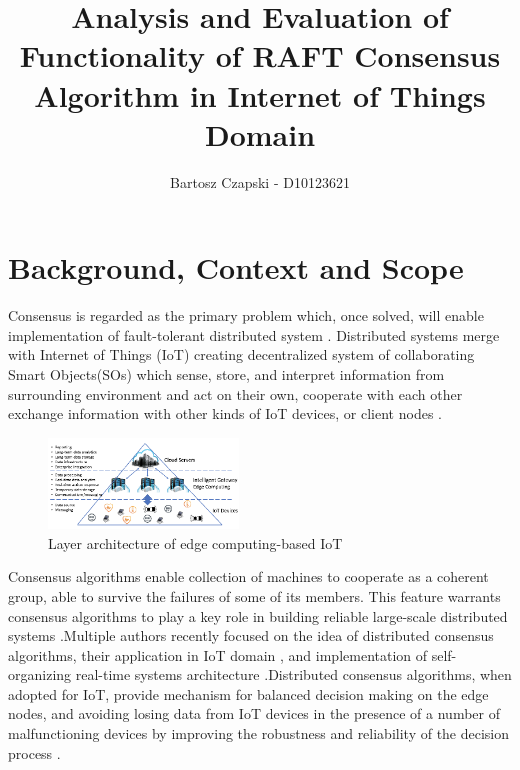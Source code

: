 \documentclass[	DIV=calc,%
							paper=a4,%
							fontsize=11pt,%
							twocolumn]{scrartcl}	 				%
\title{Analysis and Evaluation of Functionality of RAFT Consensus Algorithm in Internet of Things Domain }					%
\author{Bartosz Czapski - D10123621 }
\date{}																				%
\begin{document}
\maketitle
\thispagestyle{fancy} 			%

\section{Background, Context and Scope}
Consensus is regarded as the primary problem which, once solved, will enable implementation of fault-tolerant distributed system \cite{Lamport2005GeneralizedCA}. Distributed systems merge with Internet of Things (IoT) creating decentralized system of collaborating Smart Objects(SOs) which sense, store, and interpret information from surrounding environment and act on their own, cooperate with each other exchange information with other kinds of IoT devices, or client nodes \cite{7488250}.\begin{figure}[H]
\centering
\includegraphics[width=0.45\textwidth]{images/edge.png}
\caption{Layer architecture of edge computing-based IoT}
\end{figure}
\noindent Consensus algorithms enable collection of machines to cooperate as a coherent group, able to  survive the failures of some of its members. This feature warrants consensus algorithms to  play a key role in building reliable large-scale distributed systems \cite{10.5555/2643634.2643666}.\smallskip \newline Multiple authors recently focused on the idea of distributed consensus algorithms, their application in IoT domain \cite{BOF2017601,RAGHAV2020101291,whittaker2020matchmaker,ZHANG2020574,FORTINO202034}, and implementation of self-organizing real-time systems architecture \cite{10.1007/978-3-030-30278-8_34,GUERRERO2019131,7372286}.\smallskip \newline Distributed consensus algorithms, when adopted for IoT, provide  mechanism for balanced decision making on the edge nodes, and avoiding losing data from IoT devices in the presence of a number of malfunctioning devices by improving the robustness and reliability of the decision process \cite{6740862}.
\end{document}
